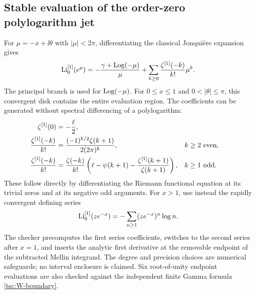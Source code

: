 \subsection{Stable evaluation of the order-zero polylogarithm jet}
For $\mu=-x+\ii\theta$ with $|\mu|<2\pi$, differentiating the classical
Jonqui\`ere expansion \cite[Eq.~25.12.12]{tsc:dlmf-poly} gives
\begin{equation}\label{tsc:Li-order-zero}
 \operatorname{Li}_0^{[1]}(e^\mu)
   =-\frac{\gamma+\operatorname{Log}(-\mu)}{\mu}
       +\sum_{k\ge0}\frac{\zeta^{[1]}(-k)}{k!}\mu^k.
\end{equation}
The principal branch is used for $\operatorname{Log}(-\mu)$.
For $0\le x\le1$ and $0<|\theta|\le\pi$, this convergent disk contains
the entire evaluation region. The coefficients can be generated without
spectral differencing of a polylogarithm:
\begin{align}\label{tsc:negative-zeta-derivative}
 \zeta^{[1]}(0)&=-\frac\ell2,\notag\\
 \frac{\zeta^{[1]}(-k)}{k!}
  &=\frac{(-1)^{k/2}\zeta(k+1)}{2(2\pi)^k},
                                      &&k\ge2\text{ even},\notag\\
 \frac{\zeta^{[1]}(-k)}{k!}
  &=\frac{\zeta(-k)}{k!}
       \left(\ell-\psi(k+1)
                     -\frac{\zeta^{[1]}(k+1)}{\zeta(k+1)}\right),
                                      &&k\ge1\text{ odd}.
\end{align}
These follow directly by differentiating the Riemann functional equation
at its trivial zeros and at its negative odd arguments.
For $x>1$, use instead the rapidly convergent defining series
\begin{equation}\label{tsc:Li-log-series}
 \operatorname{Li}_0^{[1]}(ze^{-x})=-\sum_{n\ge1}(ze^{-x})^n\log n.
\end{equation}
The checker precomputes the first series coefficients, switches to the
second series after $x=1$, and inserts the analytic first derivative at
the removable endpoint of the subtracted Mellin integrand. The degree and
precision choices are numerical safeguards; no interval enclosure is
claimed. Six root-of-unity endpoint evaluations are also checked against
the independent finite Gamma formula \eqref{tsc:W-boundary}.

